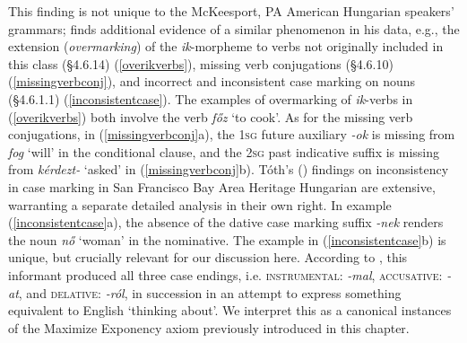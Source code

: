 \documentclass[output=paper,colorlinks,citecolor=brown,footheight=42pt]{langscibook}
\begin{document}
This finding is not unique to the McKeesport, PA American Hungarian speakers' grammars; \citet{toth2007hungry} finds additional evidence of a similar phenomenon in his data, e.g., the extension (\textit{overmarking}) of the \textit{ik}-morpheme to verbs not originally included in this class (\S4.6.14) (\ref{overikverbs}), missing verb conjugations (\S4.6.10) (\ref{missingverbconj}), and incorrect and inconsistent case marking on nouns (\S4.6.1.1) (\ref{inconsistentcase}). The examples of overmarking of \textit{ik}-verbs in (\ref{overikverbs}) both involve the verb \textit{f\H{o}z} `to cook'. As for the missing verb conjugations, in (\ref{missingverbconj}a), the \textsc{1sg} future auxiliary \textit{-ok} is missing from \textit{fog} `will' in the conditional clause, and the \textsc{2sg} past indicative suffix is missing from \textit{k\'{e}rdezt-} `asked' in (\ref{missingverbconj}b). T\'{o}th's (\citeyear{toth2007hungry}) findings on inconsistency in case marking in San Francisco Bay Area Heritage Hungarian are extensive, warranting a separate detailed analysis in their own right. In example (\ref{inconsistentcase}a), the absence of the dative case marking suffix \textit{-nek} renders the noun \textit{n\H{o}} `woman' in the nominative. The example in (\ref{inconsistentcase}b) is unique, but crucially relevant for our discussion here. According to \citet[140]{toth2007hungry}, this informant produced all three case endings, i.e. \textsc{instrumental:} \textit{-mal}, \textsc{accusative:} \textit{-at}, and \textsc{delative:} \textit{-r\'{o}l}, in succession in an attempt to express something equivalent to English `thinking about'. We interpret this as a canonical instances of the Maximize Exponency axiom previously introduced in this chapter.\largerpage 
\end{document}
